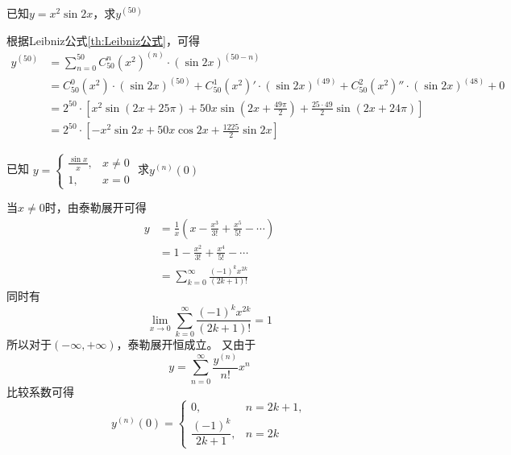 \begin{example}
    已知$y=x^2\sin 2x$，求$y^{(50)}$
\end{example}
\begin{solution}
    根据Leibniz公式\ref{th:Leibniz公式}，可得
    \begin{align*}
        y^{(50)} & = \sum_{n=0}^{50} C_{50}^n (x^2)^{(n)}\cdot(\sin 2x)^{(50-n)}                                                       \\
                 & = C_{50}^0(x^2)\cdot(\sin 2x)^{(50)} + C_{50}^1(x^2)'\cdot(\sin 2x)^{(49)} + C_{50}^2(x^2)''\cdot(\sin 2x)^{(48)}+0 \\
                 & = 2^{50}\cdot \left[ x^2 \sin(2x+25\pi) + 50x\sin(2x+\frac{49\pi}{2})+\frac{25 \cdot 49}{2}\sin(2x+24\pi) \right]   \\
                 & = 2^{50}\cdot\left[ -x^2\sin 2x + 50x\cos 2x + \frac{1225}{2}\sin 2x \right]
    \end{align*}
\end{solution}

\begin{example}
    已知
    \begin{math}
        y =
        \begin{cases}
            \frac{\sin x}{x}, & x \neq 0 \\
            1,                & x = 0
        \end{cases}
    \end{math}
    求$y^{(n)}(0)$
\end{example}
\begin{solution}
    当$x\neq 0$时，由泰勒展开可得
    \begin{align*}
        y & = \frac{1}{x}(x - \frac{x^3}{3!} + \frac{x^5}{5!} - \cdots) \\
          & = 1-\frac{x^2}{3!}+\frac{x^4}{5!}-\cdots                    \\
          & =\sum_{k=0}^\infty \frac{(-1)^{k}x^{2k}}{(2k+1)!}
    \end{align*}
    同时有
    \[ \lim_{x \to 0} \sum_{k=0}^\infty \frac{(-1)^{k}x^{2k}}{(2k+1)!} = 1 \]
    所以对于$(-\infty,+\infty)$，泰勒展开恒成立。
    又由于
    \[ y = \sum_{n=0}^{\infty}\frac{y^{(n)}}{n!}x^{n} \]
    比较系数可得
    \[
        y^{(n)}(0) =
        \begin{cases}
            0,                      & n = 2k+1, \\
            \dfrac{(-1)^{k}}{2k+1}, & n=2k
        \end{cases}
    \]
\end{solution}

